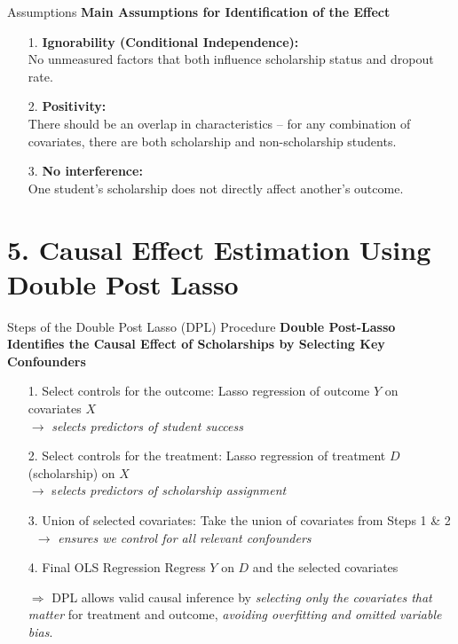 \documentclass[aspectratio=169]{beamer}
\begin{document}
\begin{frame}{Assumptions}
\textbf{Main Assumptions for Identification of the Effect}
\begin{itemize}
    \item [1.] \textbf{Ignorability (Conditional Independence):} \\No unmeasured factors that both influence scholarship status and dropout rate.
    \item [2.] \textbf{Positivity:} \\There should be an overlap in characteristics – for any combination of covariates, there are both scholarship and non-scholarship students.
    \item [3.] \textbf{No interference:} \\One student’s scholarship does not directly affect another’s outcome.
\end{itemize}

\end{frame}


\section{5. Causal Effect Estimation Using Double Post Lasso}

\begin{frame}{Steps of the Double Post Lasso (DPL) Procedure}
\textbf{Double Post-Lasso Identifies the Causal Effect of Scholarships by Selecting Key Confounders}

\begin{itemize}
	\item[1.] Select controls for the outcome: Lasso regression of outcome $Y$ on covariates $X$ \\$\rightarrow$ \textit{selects predictors of student success}
	\item[2.] Select controls for the treatment: Lasso regression of treatment $D$ (scholarship) on $X$ \\ $\rightarrow$ s\textit{elects predictors of scholarship assignment}
	\item[3.] Union of selected covariates: Take the union of covariates from Steps 1 \& 2 \\ $\rightarrow$ \textit{ensures we control for all relevant confounders}
	\item[4.] Final OLS Regression Regress $Y$ on $D$ and the selected covariates
\end{itemize}

\begin{itemize}
	\item[$\Rightarrow$] DPL allows valid causal inference by \textit{selecting only the covariates that matter} for treatment and outcome, \textit{avoiding overfitting and omitted variable bias}.
\end{itemize}
\vspace{-10pt}
\end{frame}
\end{document}
